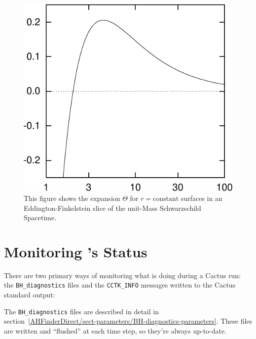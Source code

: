 \begin{description}
\begin{figure}[htbp]
\begin{center}
\includegraphics{AEIThorns_AHFinderDirect_Schw_EF_Theta_of_r}
\end{center}
\caption[Expansion $\Theta$ for $r = \text{constant}$ Surfaces
	 in an Eddington-Finkelstein slice
	 of the Unit-Mass Schwarzschild Spacetime]
	{
	This figure shows the expansion $\Theta$ for $r = \text{constant}$
	surfaces in an Eddington-Finkelstein slice of the unit-Mass
	Schwarzschild Spacetime.
	}
\label{AHFinderDirect/fig-Schwarzschild-EF-Theta(r)}
\end{figure}

\end{description}


\section{Monitoring 's Status}

There are two primary ways of monitoring what 
is doing during a Cactus run: the \verb|BH_diagnostics| files and the
\verb|CCTK_INFO| messages written to the Cactus standard output:

The \verb|BH_diagnostics| files are described in detail in
section~\ref{AHFinderDirect/sect-parameters/BH-diagnostics-parameters}.
These files are written and ``flushed'' at each time step, so they're
always up-to-date.

